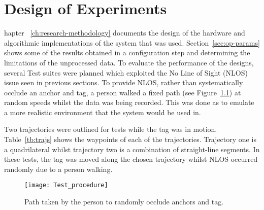 \chapter{Design of Experiments}\label{ch:design-experiments}
hapter ~\ref{ch:research-methodology} documents the design of the hardware and algorithmic implementations of the system that was used.
Section~\ref{sec:op-params} shows some of the results obtained in a configuration step and determining the limitations of the unprocessed data.
To evaluate the performance of the designs, several Test suites were planned which exploited the No Line of Sight (NLOS) issue seen in previous sections.
To provide NLOS, rather than systematically occlude an anchor and tag, a person walked a fixed path (see Figure~\ref{fig:occlude}) at random speeds whilst the data was being recorded.
This was done as to emulate a more realistic environment that the system would be used in.

Two trajectories were outlined for tests while the tag was in motion.
Table~\ref{tb:trajs} shows the waypoints of each of the trajectories.
Trajectory one is a quadrilateral whilst trajectory two is a combination of straight-line segments.
In these tests, the tag was moved along the chosen trajectory whilst NLOS occurred randomly due to a person walking.

\begin{figure}[ht!]
    \centering
    \texttt{[image: Test\_procedure]}
    \caption{Path taken by the person to randomly occlude anchors and tag.}
    \label{fig:occlude}
\end{figure}

